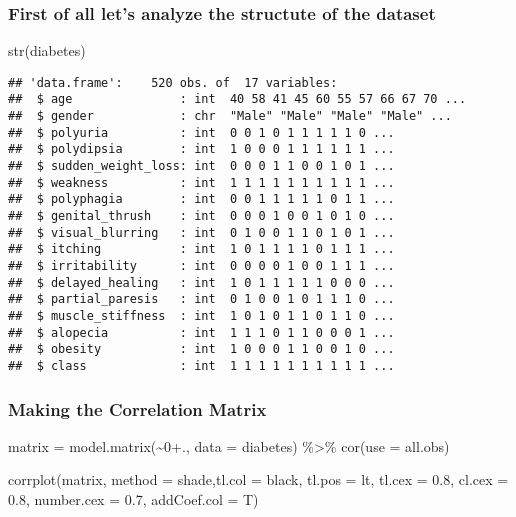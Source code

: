 \documentclass[
]{article}
\newenvironment{Shaded}{\begin{snugshade}}{\end{snugshade}}
\newcommand{\AttributeTok}[1]{\textcolor[rgb]{0.77,0.63,0.00}{#1}}
\newcommand{\DecValTok}[1]{\textcolor[rgb]{0.00,0.00,0.81}{#1}}
\newcommand{\FloatTok}[1]{\textcolor[rgb]{0.00,0.00,0.81}{#1}}
\newcommand{\FunctionTok}[1]{\textcolor[rgb]{0.00,0.00,0.00}{#1}}
\newcommand{\NormalTok}[1]{#1}
\newcommand{\OtherTok}[1]{\textcolor[rgb]{0.56,0.35,0.01}{#1}}
\newcommand{\SpecialCharTok}[1]{\textcolor[rgb]{0.00,0.00,0.00}{#1}}
\newcommand{\StringTok}[1]{\textcolor[rgb]{0.31,0.60,0.02}{#1}}
\begin{document}
\hypertarget{first-of-all-lets-analyze-the-structute-of-the-dataset}{%
\subsubsection{First of all let's analyze the structute of the
dataset}\label{first-of-all-lets-analyze-the-structute-of-the-dataset}}

\begin{Shaded}
\begin{Highlighting}[]
\FunctionTok{str}\NormalTok{(diabetes)}
\end{Highlighting}
\end{Shaded}

\begin{verbatim}
## 'data.frame':    520 obs. of  17 variables:
##  $ age               : int  40 58 41 45 60 55 57 66 67 70 ...
##  $ gender            : chr  "Male" "Male" "Male" "Male" ...
##  $ polyuria          : int  0 0 1 0 1 1 1 1 1 0 ...
##  $ polydipsia        : int  1 0 0 0 1 1 1 1 1 1 ...
##  $ sudden_weight_loss: int  0 0 0 1 1 0 0 1 0 1 ...
##  $ weakness          : int  1 1 1 1 1 1 1 1 1 1 ...
##  $ polyphagia        : int  0 0 1 1 1 1 1 0 1 1 ...
##  $ genital_thrush    : int  0 0 0 1 0 0 1 0 1 0 ...
##  $ visual_blurring   : int  0 1 0 0 1 1 0 1 0 1 ...
##  $ itching           : int  1 0 1 1 1 1 0 1 1 1 ...
##  $ irritability      : int  0 0 0 0 1 0 0 1 1 1 ...
##  $ delayed_healing   : int  1 0 1 1 1 1 1 0 0 0 ...
##  $ partial_paresis   : int  0 1 0 0 1 0 1 1 1 0 ...
##  $ muscle_stiffness  : int  1 0 1 0 1 1 0 1 1 0 ...
##  $ alopecia          : int  1 1 1 0 1 1 0 0 0 1 ...
##  $ obesity           : int  1 0 0 0 1 1 0 0 1 0 ...
##  $ class             : int  1 1 1 1 1 1 1 1 1 1 ...
\end{verbatim}

\hypertarget{making-the-correlation-matrix}{%
\subsubsection{Making the Correlation
Matrix}\label{making-the-correlation-matrix}}

\begin{Shaded}
\begin{Highlighting}[]
\NormalTok{matrix }\OtherTok{=} \FunctionTok{model.matrix}\NormalTok{(}\SpecialCharTok{\textasciitilde{}}\DecValTok{0}\SpecialCharTok{+}\NormalTok{., }\AttributeTok{data =}\NormalTok{ diabetes) }\SpecialCharTok{\%\textgreater{}\%} \FunctionTok{cor}\NormalTok{(}\AttributeTok{use =} \StringTok{\textquotesingle{}all.obs\textquotesingle{}}\NormalTok{)}

\FunctionTok{corrplot}\NormalTok{(matrix, }\AttributeTok{method =} \StringTok{\textquotesingle{}shade\textquotesingle{}}\NormalTok{,}\AttributeTok{tl.col =} \StringTok{\textquotesingle{}black\textquotesingle{}}\NormalTok{, }\AttributeTok{tl.pos =} \StringTok{\textquotesingle{}lt\textquotesingle{}}\NormalTok{, }\AttributeTok{tl.cex =} \FloatTok{0.8}\NormalTok{, }\AttributeTok{cl.cex =} \FloatTok{0.8}\NormalTok{, }\AttributeTok{number.cex =} \FloatTok{0.7}\NormalTok{, }\AttributeTok{addCoef.col =}\NormalTok{ T)}
\end{Highlighting}
\end{Shaded}
\end{document}
